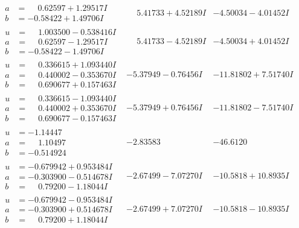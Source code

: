 \documentclass[1p]{elsarticle_modified}
\theoremstyle{definition}
\begin{document}
$$\begin{array}{c|c|c}
\begin{aligned}
a &= \phantom{-}0.62597 + 1.29517 I \\
b &= -0.58422 + 1.49706 I\end{aligned}
 & \phantom{-}5.41733 + 4.52189 I & -4.50034 - 4.01452 I \\ \hline\begin{aligned}
u &= \phantom{-}1.003500 - 0.538416 I \\
a &= \phantom{-}0.62597 - 1.29517 I \\
b &= -0.58422 - 1.49706 I\end{aligned}
 & \phantom{-}5.41733 - 4.52189 I & -4.50034 + 4.01452 I \\ \hline\begin{aligned}
u &= \phantom{-}0.336615 + 1.093440 I \\
a &= \phantom{-}0.440002 - 0.353670 I \\
b &= \phantom{-}0.690677 + 0.157463 I\end{aligned}
 & -5.37949 - 0.76456 I & -11.81802 + 7.51740 I \\ \hline\begin{aligned}
u &= \phantom{-}0.336615 - 1.093440 I \\
a &= \phantom{-}0.440002 + 0.353670 I \\
b &= \phantom{-}0.690677 - 0.157463 I\end{aligned}
 & -5.37949 + 0.76456 I & -11.81802 - 7.51740 I \\ \hline\begin{aligned}
u &= -1.14447\phantom{ +0.000000I} \\
a &= \phantom{-}1.10497\phantom{ +0.000000I} \\
b &= -0.514924\phantom{ +0.000000I}\end{aligned}
 & -2.83583\phantom{ +0.000000I} & -46.6120\phantom{ +0.000000I} \\ \hline\begin{aligned}
u &= -0.679942 + 0.953484 I \\
a &= -0.303900 - 0.514678 I \\
b &= \phantom{-}0.79200 - 1.18044 I\end{aligned}
 & -2.67499 - 7.07270 I & -10.5818 + 10.8935 I \\ \hline\begin{aligned}
u &= -0.679942 - 0.953484 I \\
a &= -0.303900 + 0.514678 I \\
b &= \phantom{-}0.79200 + 1.18044 I\end{aligned}
 & -2.67499 + 7.07270 I & -10.5818 - 10.8935 I \\ \hline\begin{aligned}

\end{aligned}
\end{array}$$
\end{document}
